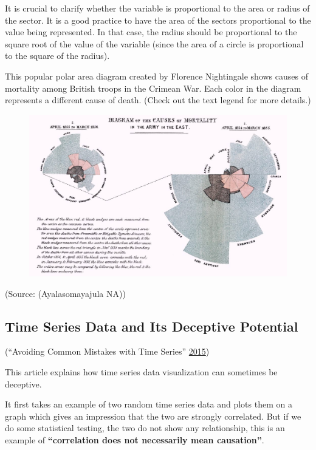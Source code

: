 \documentclass[]{book}
\theoremstyle{definition}
\theoremstyle{definition}
\theoremstyle{definition}
\theoremstyle{remark}
\begin{document}
It is crucial to clarify whether the variable is proportional to the
area or radius of the sector. It is a good practice to have the area of
the sectors proportional to the value being represented. In that case,
the radius should be proportional to the square root of the value of the
variable (since the area of a circle is proportional to the square of
the radius).

This popular polar area diagram created by Florence Nightingale shows
causes of mortality among British troops in the Crimean War. Each color
in the diagram represents a different cause of death. (Check out the
text legend for more details.)

\begin{figure}
\centering
\includegraphics{images/aya-polar.jpg}
\caption{}
\end{figure}

(Source: (Ayalasomayajula NA))

\subsection{Time Series Data and Its Deceptive
Potential}\label{time-series-data-and-its-deceptive-potential}

(``Avoiding Common Mistakes with Time Series''
\protect\hyperlink{ref-TimeSeries}{2015})

This article explains how time series data visualization can sometimes
be deceptive.

It first takes an example of two random time series data and plots them
on a graph which gives an impression that the two are strongly
correlated. But if we do some statistical testing, the two do not show
any relationship, this is an example of \textbf{``correlation does not
necessarily mean causation''}.
\end{document}
